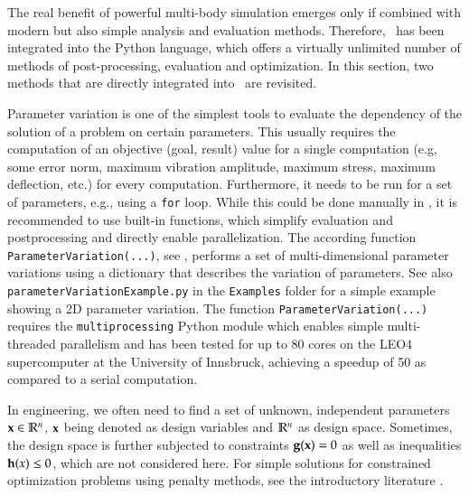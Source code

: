 %




\newpage
{}
%
The real benefit of powerful multi-body simulation emerges only if combined with modern but also simple analysis and evaluation methods.
Therefore, \codeName\ has been integrated into the Python language, which offers a virtually unlimited number of methods of post-processing, evaluation and optimization.
In this section, two methods that are directly integrated into \codeName\ are revisited.
%

Parameter variation is one of the simplest tools to evaluate the dependency of the solution of a problem on certain parameters. This usually requires the computation of an objective (goal, result) value for a single computation (e.g, some error norm, maximum vibration amplitude, maximum stress, maximum deflection, etc.) for every computation. Furthermore, it needs to be run for a set of parameters, e.g., using a \texttt{for} loop.
While this could be done manually in \codeName , it is recommended to use built-in functions, which simplify evaluation and postprocessing and directly enable parallelization.
The according function \texttt{ParameterVariation(...)}, see , performs a set of multi-dimensional parameter variations using a dictionary that describes the variation of parameters. See also \texttt{parameterVariationExample.py} in the \texttt{Examples} folder for a simple example showing a 2D parameter variation. The function \texttt{ParameterVariation(...)} requires the \texttt{multiprocessing} Python module which enables simple multi-threaded parallelism and has been tested for up to 80 cores on the LEO4 supercomputer at the University of Innsbruck, achieving a speedup of 50 as compared to a serial computation.

%
In engineering, we often need to find a set of unknown, independent parameters $\mathbf{x} \in \mathbb{R}^n$, $\mathbf{x}$ being denoted as design variables and $\mathbb{R}^n$ as design space. Sometimes, the design space is further subjected to constraints $\mathbf{g}(\mathbf{x})=0$ as well as inequalities $\mathbf{h}(x) \le 0$, which are not considered here. For simple solutions for constrained optimization problems using penalty methods, see the introductory literature \cite{Kiusalaas2013}.

